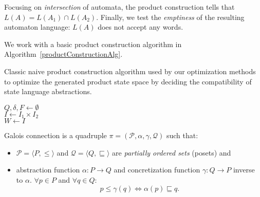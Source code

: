 Focusing on \emph{intersection} of automata, the product construction tells that \\ $ L(A) = L(A_1) \cap L(A_2) $. Finally, we test the \emph{emptiness} of the resulting automaton language: $L(A)$ does not accept any words.

We work with a basic product construction algorithm in Algorithm~\ref{productConstructionAlg}.

\begin{algorithm}
\caption{Classic naive product construction algorithm used by our optimization methods to optimize the generated product state space by deciding the compatibility of state language abstractions.}\label{productConstructionAlg}
\DontPrintSemicolon
{}
\BlankLine
$Q, \delta, F \gets \emptyset$ \\
$I \gets I_1 \times I_2$ \\
$W \gets  I$

\end{algorithm}

\begin{definition} \hfill \newline
Galois connection is a quadruple $\pi = (\mathcal{P}, \alpha, \gamma, \mathcal{Q})$ such that:

\begin{itemize}
    \item $\mathcal{P} = \langle P, \leq \rangle$ and $\mathcal{Q} = \langle Q, \sqsubseteq \rangle$ are \emph{partially ordered sets} (posets) and
    \item abstraction function $\alpha : P \rightarrow Q$ and concretization function $\gamma : Q \rightarrow P$ inverse to $\alpha$. $\forall p \in P$ and $\forall q \in Q$:
    \[
        p \leq \gamma(q) \Leftrightarrow \alpha(p) \sqsubseteq q \text{.}
    \]
\end{itemize}

\end{definition}

